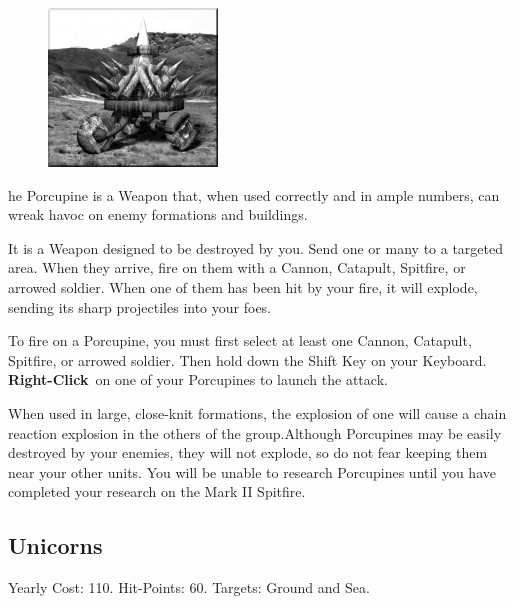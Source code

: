 \begin{figure}
	\vspace{-20pt}
	\begin{center}
		\includegraphics[width=0.4\textwidth]{Aporcupine}
	\end{center}
\end{figure}

he Porcupine is a Weapon that, when used correctly and in ample numbers, can wreak havoc on enemy formations and buildings.

It is a Weapon designed to be destroyed by you. Send one or many to a targeted area. When they arrive, fire on them with a Cannon, Catapult, Spitfire, or arrowed soldier. When one of them has been hit by your fire, it will explode, sending its sharp projectiles into your foes.

To fire on a Porcupine, you must first select at least one Cannon, Catapult, Spitfire, or arrowed soldier. Then hold down the Shift Key on your Keyboard. \textbf{Right-Click} on one of your Porcupines to launch the attack.

When used in large, close-knit formations, the explosion of one will cause a chain reaction explosion in the others of the group.Although Porcupines may be easily destroyed by your enemies, they will not explode, so do not fear keeping them near your other units. You will be unable to research Porcupines until you have completed your research on the Mark II Spitfire.

\clearpage

\subsection{Unicorns}


\begin{center}
	Yearly Cost: 110. Hit-Points: 60. Targets: Ground and Sea.
\end{center}

